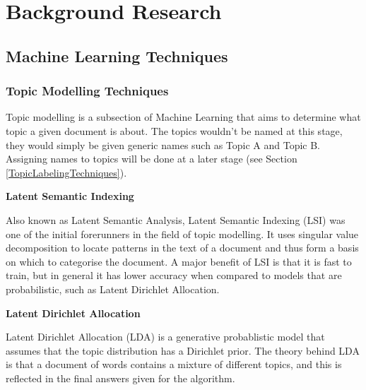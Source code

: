 \documentclass[12pt]{article}
\begin{document}

\pagebreak

\section{Background Research}

\subsection{Machine Learning Techniques}

\subsubsection{Topic Modelling Techniques}

\label{TopicModellingTechniques}

Topic modelling is a subsection of Machine Learning that aims to determine what topic a given document is about. The topics wouldn't be named at this stage, they would simply be given generic names such as Topic A and Topic B. Assigning names to topics will be done at a later stage (see Section \ref{TopicLabelingTechniques}).

\textbf{Latent Semantic Indexing}

Also known as Latent Semantic Analysis\cite{lsa}, Latent Semantic Indexing (LSI) was one of the initial forerunners in the field of topic modelling. It uses singular value decomposition to locate patterns in the text of a document and thus form a basis on which to categorise the document. A major benefit of LSI is that it is fast to train, but in general it has lower accuracy when compared to models that are probabilistic, such as Latent Dirichlet Allocation\cite{differenceBetweenLSIAndLDA}.

\textbf{Latent Dirichlet Allocation}

Latent Dirichlet Allocation (LDA) is a generative probablistic model that assumes that the topic distribution has a Dirichlet prior. The theory behind LDA is that a document of words contains a mixture of different topics, and this is reflected in the final answers given for the algorithm.
\end{document}
